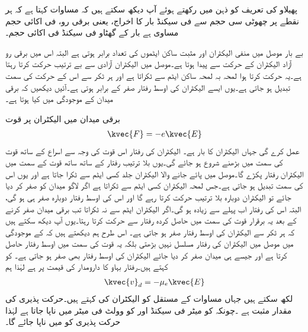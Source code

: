 پھیلاو کی تعریف کو ذہن میں رکھتے ہوئے آپ دیکھ سکتے ہیں کہ مساوات  کہتا ہے کہ ہر نقطے پر چھوٹی سی حجم سے فی سیکنڈ بار کا اخراج، یعنی برقی رو، فی اکائی حجم مساوی ہے بار کے گھٹاو فی سیکنڈ فی اکائی حجم۔ 


بے  بار موصل میں منفی الیکٹران اور مثبت ساکن ایٹموں کی تعداد برابر ہوتی ہے البتہ اس میں برقی رو آزاد الیکٹران کے حرکت سے پیدا ہوتا ہے۔موصل میں الیکٹران آزادی سے بے ترتیب حرکت کرتا رہتا ہے۔یہ حرکت کرتا ہوا لمحہ بہ لمحہ ساکن ایٹم سے ٹکراتا ہے اور ہر ٹکر سے اس کے حرکت کی سمت تبدیل ہو جاتی ہے۔یوں ایسے الیکٹران کی اوسط رفتار صفر کے برابر ہوتی ہے۔آئیں دیکھیں کہ برقی میدان کے موجودگی میں کیا ہوتا ہے۔

برقی میدان  میں الیکٹران پر قوت
\begin{align}
\kvec{F}=-e\kvec{E}
\end{align}
عمل کرے گی جہاں الیکٹران کا بار  ہے۔ الیکٹران کی رفتار اس قوت کی وجہ سے  اسراع کے ساتھ قوت کی سمت میں بڑھنے شروع ہو جائے گی۔یوں بلا ترتیب رفتار  کے ساتھ ساتھ قوت کے سمت میں الیکٹران رفتار پکڑے گا۔موصل میں پائے جانے والا الیکٹران جلد کسی ایٹم سے ٹکرا جاتا ہے اور یوں اس کی سمت تبدیل ہو جاتی ہے۔جس لمحہ  الیکٹران کسی ایٹم سے ٹکراتا ہے اگر لاگو میدان کو صفر کر دیا جائے تو الیکٹران دوبارہ بلا ترتیب حرکت کرتا رہے گا اور اس کی اوسط رفتار دوبارہ صفر ہی ہو گی،  البتہ اس کی رفتار اب پہلے سے زیادہ ہو گی۔اگر الیکٹران ایٹم سے نہ ٹکراتا تب برقی میدان صفر کرنے کے بعد یہ برقرار قوت کی سمت میں حاصل کردہ رفتار سے حرکت کرتا رہتا۔یوں آپ دیکھ سکتے ہیں کہ ہر ٹکر سے الیکٹران کی اوسط رفتار صفر ہو جاتی ہے۔
اس طرح ہم دیکھتے ہیں کہ   کے موجودگی میں موصل میں الیکٹران کی رفتار مسلسل نہیں بڑھتی بلکہ یہ قوت کی سمت میں اوسط رفتار  حاصل کرتا ہے اور جیسے ہی میدان صفر کر دیا جائے الیکٹران کی اوسط رفتار بھی صفر ہو جاتی ہے۔ کو  کہتے ہیں۔رفتار بہاو کا دارومدار  کی قیمت پر ہے لہٰذا ہم
\begin{align}\label{مساوات_کپیسٹر_رفتار_بہاو}
\kvec{v}_d=-\mu_e \kvec{E}
\end{align}
لکھ سکتے ہیں جہاں مساوات کے مستقل  کو الیکٹران کی  کہتے ہیں۔حرکت پذیری کی مقدار مثبت ہے ۔چونکہ  کو میٹر فی سیکنڈ اور  کو وولٹ فی میٹر میں ناپا جاتا ہے لہٰذا حرکت پذیری کو  میں ناپا جائے گا۔

